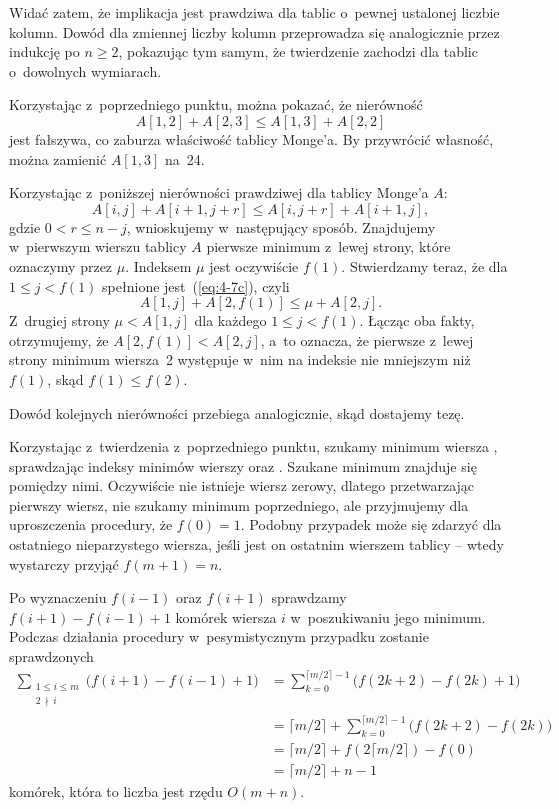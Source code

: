 Widać zatem, że implikacja jest prawdziwa dla tablic o~pewnej ustalonej liczbie kolumn. Dowód dla zmiennej liczby kolumn przeprowadza się analogicznie przez indukcję po $n\ge2$, pokazując tym samym, że twierdzenie zachodzi dla tablic o~dowolnych wymiarach.

\subproblem %
Korzystając z~poprzedniego punktu, można pokazać, że nierówność
\[
	A[1,2]+A[2,3] \le A[1,3]+A[2,2]
\]
jest fałszywa, co zaburza właściwość tablicy Monge'a. By przywrócić własność, można zamienić $A[1,3]$ na~24.

\subproblem %
Korzystając z~poniższej nierówności prawdziwej dla tablicy Monge'a $A$:
\[
	A[i,j]+A[i+1,j+r] \le A[i,j+r]+A[i+1,j], \tag{$*$}\label{eq:4-7c}
\]
gdzie $0<r\le n-j$, wnioskujemy w~następujący sposób. Znajdujemy w~pierwszym wierszu tablicy $A$ pierwsze minimum z~lewej strony, które oznaczymy przez $\mu$. Indeksem $\mu$ jest oczywiście $f(1)$. Stwierdzamy teraz, że dla $1\le j<f(1)$ spełnione jest~(\ref{eq:4-7c}), czyli
\[
	A[1,j]+A[2,f(1)] \le \mu+A[2,j].
\]
Z~drugiej strony $\mu<A[1,j]$ dla każdego $1\le j<f(1)$. Łącząc oba fakty, otrzymujemy, że $A[2,f(1)]<A[2,j]$, a~to oznacza, że pierwsze z~lewej strony minimum wiersza~2 występuje w~nim na indeksie nie mniejszym niż $f(1)$, skąd $f(1)\le f(2)$.

Dowód kolejnych nierówności przebiega analogicznie, skąd dostajemy tezę.

\subproblem %
Korzystając z~twierdzenia z~poprzedniego punktu, szukamy minimum wiersza , sprawdzając indeksy minimów wierszy  oraz . Szukane minimum znajduje się pomiędzy nimi. Oczywiście nie istnieje wiersz zerowy, dlatego przetwarzając pierwszy wiersz, nie szukamy minimum poprzedniego, ale przyjmujemy dla uproszczenia procedury, że $f(0)=1$. Podobny przypadek może się zdarzyć dla ostatniego nieparzystego wiersza, jeśli jest on ostatnim wierszem tablicy -- wtedy wystarczy przyjąć $f(m+1)=n$.

Po wyznaczeniu $f(i-1)$ oraz $f(i+1)$ sprawdzamy $f(i+1)-f(i-1)+1$ komórek wiersza $i$ w~poszukiwaniu jego minimum. Podczas działania procedury w~pesymistycznym przypadku zostanie sprawdzonych
\begin{align*}
	\sum_{\substack{1\le i\le m\\2\,\nmid\,i}}\bigl(f(i+1)-f(i-1)+1\bigr) &= \sum_{k=0}^{\lceil m/2\rceil-1}\bigl(f(2k+2)-f(2k)+1\bigr) \\[-4mm]
	&= \lceil m/2\rceil+\sum_{k=0}^{\lceil m/2\rceil-1}\bigl(f(2k+2)-f(2k)) \\[1mm]
	&= \lceil m/2\rceil+f(2\lceil m/2\rceil)-f(0) \\[2mm]
	&= \lceil m/2\rceil+n-1
\end{align*}
komórek, która to liczba jest rzędu $O(m+n)$.

